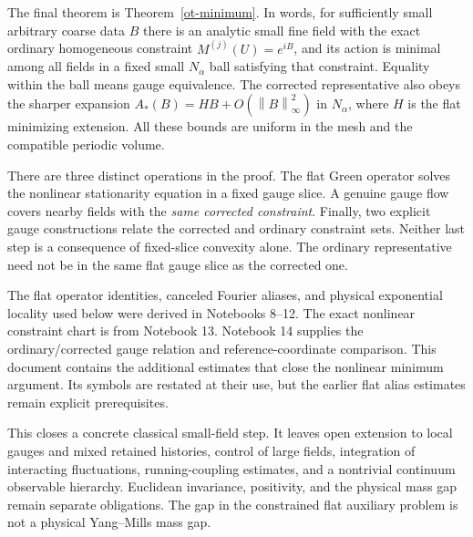 \documentclass[11pt]{article}
\theoremstyle{remark}
\newcommand{\norm}[1]{\left\|#1\right\|}
\begin{document}
The final theorem is Theorem~\ref{ot-minimum}. In words,
for sufficiently small arbitrary coarse data $B$ there is an
analytic small fine field with the exact ordinary homogeneous
constraint $M^{(j)}(U)=e^{iB}$, and its action is minimal among
all fields in a fixed small $N_\alpha$ ball satisfying that
constraint. Equality within the ball means gauge equivalence.
The corrected representative also obeys the sharper expansion
$A_*(B)=HB+O(\norm{B}_\infty^2)$ in $N_\alpha$, where $H$
is the flat minimizing extension. All these bounds are uniform
in the mesh and the compatible periodic volume.

There are three distinct operations in the proof. The flat
Green operator solves the nonlinear stationarity equation in
a fixed gauge slice. A genuine gauge flow covers nearby fields
with the \emph{same corrected constraint}. Finally, two explicit
gauge constructions relate the corrected and ordinary constraint
sets. Neither last step is a consequence of fixed-slice convexity
alone. The ordinary representative need not be in the same flat
gauge slice as the corrected one.

The flat operator identities, canceled Fourier aliases, and
physical exponential locality used below were derived in
Notebooks 8--12. The exact nonlinear constraint chart is from
Notebook 13. Notebook 14 supplies the ordinary/corrected gauge
relation and reference-coordinate comparison. This document
contains the additional estimates that close the nonlinear
minimum argument. Its symbols are restated at their use, but
the earlier flat alias estimates remain explicit prerequisites.

This closes a concrete classical small-field step. It leaves
open extension to local gauges and mixed retained histories,
control of large fields, integration of interacting fluctuations,
running-coupling estimates, and a nontrivial continuum observable
hierarchy. Euclidean invariance, positivity, and the physical
mass gap remain separate obligations. The gap in the constrained
flat auxiliary problem is not a physical Yang--Mills mass gap.
\end{document}
